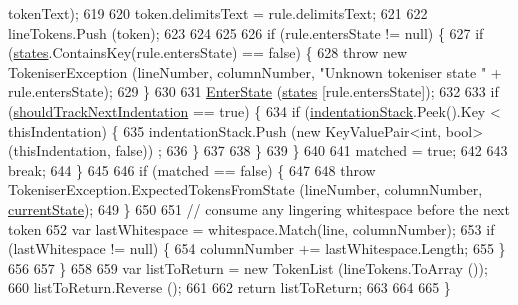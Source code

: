 \begin{DoxyCode}
      tokenText);
619 
620                     token.delimitsText = rule.delimitsText;
621 
622                     lineTokens.Push (token);
623 
624 
625 
626                     \textcolor{keywordflow}{if} (rule.entersState != null) \{
627                         \textcolor{keywordflow}{if} (\hyperlink{a00099_a2c65c0ba90f973e459583badefef216a}{states}.ContainsKey(rule.entersState) == \textcolor{keyword}{false}) \{
628                             \textcolor{keywordflow}{throw} \textcolor{keyword}{new} TokeniserException (lineNumber, columnNumber, \textcolor{stringliteral}{"Unknown tokeniser
       state "} + rule.entersState);
629                         \}
630 
631                         \hyperlink{a00099_ad3ef08f822b310d9864774b057b96995}{EnterState} (\hyperlink{a00099_a2c65c0ba90f973e459583badefef216a}{states} [rule.entersState]);
632 
633                         \textcolor{keywordflow}{if} (\hyperlink{a00099_ac670aac2245cbd4694dfbd5b69313218}{shouldTrackNextIndentation} == \textcolor{keyword}{true}) \{
634                             \textcolor{keywordflow}{if} (\hyperlink{a00099_a6631a1b1a9109258ab18927e7587ff9b}{indentationStack}.Peek().Key < thisIndentation) \{
635                                 indentationStack.Push (\textcolor{keyword}{new} KeyValuePair<int, bool>(thisIndentation, \textcolor{keyword}{false}))
      ;
636                             \}
637                                 
638                         \}
639                     \}
640 
641                     matched = \textcolor{keyword}{true};
642 
643                     \textcolor{keywordflow}{break};
644                 \}
645 
646                 \textcolor{keywordflow}{if} (matched == \textcolor{keyword}{false}) \{
647 
648                     \textcolor{keywordflow}{throw} TokeniserException.ExpectedTokensFromState (lineNumber, columnNumber, 
      \hyperlink{a00099_ac90b7dce8103425a148f9e8588f14137}{currentState});
649                 \}
650 
651                 \textcolor{comment}{// consume any lingering whitespace before the next token}
652                 var lastWhitespace = whitespace.Match(line, columnNumber);
653                 \textcolor{keywordflow}{if} (lastWhitespace != null) \{
654                     columnNumber += lastWhitespace.Length;
655                 \}
656 
657             \}
658 
659             var listToReturn = \textcolor{keyword}{new} TokenList (lineTokens.ToArray ());
660             listToReturn.Reverse ();
661 
662             \textcolor{keywordflow}{return} listToReturn;
663 
664 
665         \}
\end{DoxyCode}


